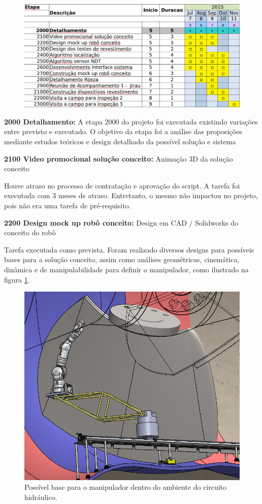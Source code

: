 \begin{figure}[H]
\centering
\includegraphics[width=0.9\columnwidth]{figs/etapa2}
\end{figure} 

\noindent
\textbf{2000 Detalhamento:} A etapa 2000 do projeto foi executada existindo
variações entre previsto e executado. O objetivo da etapa foi a análise das
proposições mediante estudos teóricos e design detalhado da possível solução e sistema

\noindent
\textbf{2100 Video promocional solução conceito:} Animação 3D da solução
conceito

Houve atraso no processo de contratação e aprovação do script. A tarefa foi
executada com 3 meses de atraso. Entretanto, o mesmo não impactou no projeto,
pois não era uma tarefa de pré-requisito.

\noindent
\textbf{2200 Design mock up robô conceito:} Design em CAD / Solidworks do
conceito do robô

Tarefa executada como prevista. Foram realizado diversos designs para possíveis
bases para a solução conceito, assim como análises geométricas, cinemática,
dinâmica e de manipulabilidade para definir o manipulador, como ilustrado na
figura \ref{fig::ex_cad}.

\begin{figure}
\centering
\includegraphics[width=0.6\columnwidth]{figs/EMMA_Base_Conceito_PRR}
\caption{Possível base para o manipulador dentro do ambiente do circuito
hidráulico.}
\label{fig::ex_cad}
\end{figure} 


